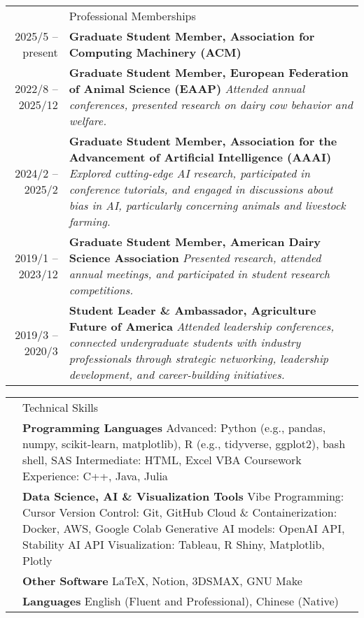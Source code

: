 \documentclass[letterpaper, 11pt]{article}
\newcommand{\headingfont}{\Large\color{OliveGreen}}
\newenvironment{SectionTable}[1]{
	\renewcommand*{\arraystretch}{1.7}
	\setlength{\tabcolsep}{10pt}
	\begin{longtable}{Rp{5.2in}} & #1 \\}
{\end{longtable}\vspace{-.3cm}}
\begin{document}
\begin{SectionTable}{\headingfont Professional Memberships}
2025/5 -- present &
\textbf{Graduate Student Member, Association for Computing Machinery (ACM)} \\
2022/8 -- 2025/12 &
\textbf{Graduate Student Member, European Federation of Animal Science (EAAP)} \newline
\textit{Attended annual conferences, presented research on dairy cow behavior and welfare.} \\
2024/2 -- 2025/2 &
\textbf{Graduate Student Member, Association for the Advancement of Artificial Intelligence (AAAI)} \newline
\textit{Explored cutting-edge AI research, participated in conference tutorials, and engaged in discussions about bias in AI, particularly concerning animals and livestock farming.} \\
2019/1 -- 2023/12 &
\textbf{Graduate Student Member, American Dairy Science Association} \newline
\textit{Presented research, attended annual meetings, and participated in student research competitions.} \\
2019/3 -- 2020/3 &
\textbf{Student Leader \& Ambassador, Agriculture Future of America} \newline
\textit{Attended leadership conferences, connected undergraduate students with industry professionals through strategic networking, leadership development, and career-building initiatives.} \\
\end{SectionTable}

\begin{SectionTable}{\headingfont Technical Skills}
& \textbf{Programming Languages} \newline
Advanced: Python (e.g., pandas, numpy, scikit-learn, matplotlib), R (e.g., tidyverse, ggplot2), bash shell, SAS \newline
Intermediate: HTML, Excel VBA \newline
Coursework Experience: C++, Java, Julia \\
& \textbf{Data Science, AI \& Visualization Tools} \newline
Vibe Programming: Cursor \newline
Version Control: Git, GitHub \newline
Cloud \& Containerization: Docker, AWS, Google Colab\newline
Generative AI models: OpenAI API, Stability AI API\newline
Visualization: Tableau, R Shiny, Matplotlib, Plotly \\
& \textbf{Other Software} \newline
\LaTeX, Notion, 3DSMAX, GNU Make \\
& \textbf{Languages} \newline
English (Fluent and Professional), Chinese (Native)
\end{SectionTable}


\end{document}
